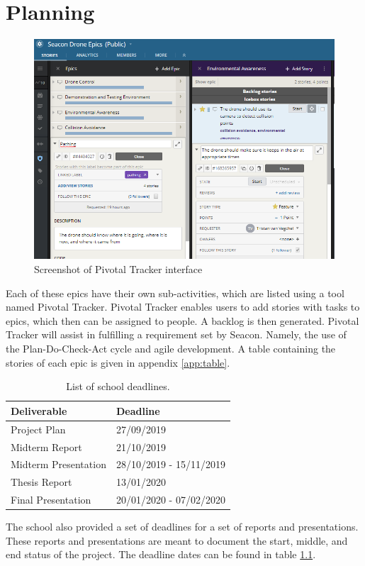 \chapter{Planning}
\label{ch:planning}

\begin{figure}[h]
	\centering
	\includegraphics[scale=0.65]{"img/screenshot_pivotaltracker"}
	\caption{Screenshot of Pivotal Tracker interface}
	\label{fig:screenshot_pivtracker}
\end{figure}

\noindent
Each of these epics have their own sub-activities, which are listed using a tool named Pivotal Tracker. Pivotal Tracker enables users to add stories with tasks to epics, which then can be assigned to people. A backlog is then generated. Pivotal Tracker will assist in fulfilling a requirement set by Seacon. Namely, the use of the Plan-Do-Check-Act cycle and agile development. A table containing the stories of each epic is given in appendix \ref{app:table}.\pagebreak

\begin{table}[h]
	\centering
	\begin{tabular}{|l|l|}
		\hline
		\textbf{Deliverable} & \textbf{Deadline} \\ \hline
		Project Plan & 27/09/2019 \\
		Midterm Report & 21/10/2019 \\
		Midterm Presentation & 28/10/2019 - 15/11/2019 \\
		Thesis Report & 13/01/2020 \\
		Final Presentation & 20/01/2020 - 07/02/2020 \\ \hline
	\end{tabular}
	\caption{List of school deadlines.}
	\label{tab:deadlines}
\end{table}

\noindent
The school also provided a set of deadlines for a set of reports and presentations. These reports and presentations are meant to document the start, middle, and end status of the project. The deadline dates can be found in table \ref{tab:deadlines}.